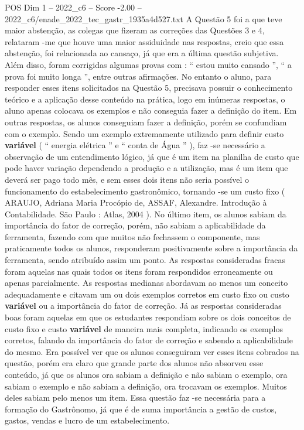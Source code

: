 \begin{textsample}{POS Dim 1 – 2022\_c6 – Score -2.00 – 2022\_c6/enade\_2022\_tec\_gastr\_1935a4d527.txt}
A Questão 5 foi a que teve maior abstenção, as colegas que fizeram as correções das Questões 3 e 4, relataram -me que houve uma maior assiduidade nas respostas, creio que essa abstenção, foi relacionada ao cansaço, já que era a última questão subjetiva.
Além disso, foram corrigidas algumas provas com : “ estou muito cansado ”, “ a prova foi muito longa ”, entre outras afirmações.
No entanto o aluno, para responder esses itens solicitados na Questão 5, precisava possuir o conhecimento teórico e a aplicação desse conteúdo na prática, logo em inúmeras respostas, o aluno apenas colocava os exemplos e não conseguia fazer a definição do item.
Em outras respostas, os alunos conseguiam fazer a definição, porém se confundiam com o exemplo.
Sendo um exemplo extremamente utilizado para definir custo \textbf{variável} ( “ energia elétrica ” e “ conta de Água ” ), faz -se necessário a observação de um entendimento lógico, já que é um item na planilha de custo que pode haver variação dependendo a produção e a utilização, mas é um item que deverá ser pago todo mês, e sem esses dois itens não seria possível o funcionamento do estabelecimento gastronômico, tornando -se um custo fixo ( ARAUJO, Adriana Maria Procópio de, ASSAF, Alexandre.
Introdução à Contabilidade.
São Paulo : Atlas, 2004 ).
No último item, os alunos sabiam da importância do fator de correção, porém, não sabiam a aplicabilidade da ferramenta, fazendo com que muitos não fechassem o componente, mas praticamente todos os alunos, responderam positivamente sobre a importância da ferramenta, sendo atribuído assim um ponto.
As respostas consideradas fracas foram aquelas nas quais todos os itens foram respondidos erroneamente ou apenas parcialmente.
As respostas medianas abordavam ao menos um conceito adequadamente e citavam um ou dois exemplos corretos em custo fixo ou custo \textbf{variável} ou a importância do fator de correção.
Já as respostas consideradas boas foram aquelas em que os estudantes respondiam sobre os dois conceitos de custo fixo e custo \textbf{variável} de maneira mais completa, indicando os exemplos corretos, falando da importância do fator de correção e sabendo a aplicabilidade do mesmo.
Era possível ver que os alunos conseguiram ver esses itens cobrados na questão, porém era claro que grande parte dos alunos não absorveu esse conteúdo, já que os alunos ora sabiam a definição e não sabiam o exemplo, ora sabiam o exemplo e não sabiam a definição, ora trocavam os exemplos.
Muitos deles sabiam pelo menos um item.
Essa questão faz -se necessária para a formação do Gastrônomo, já que é de suma importância a gestão de custos, gastos, vendas e lucro de um estabelecimento.

\end{textsample}
